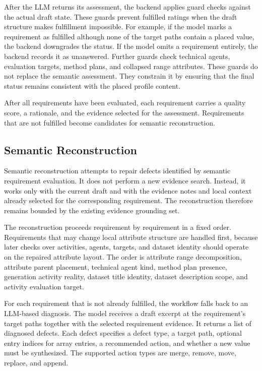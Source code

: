 After the \ac{LLM} returns its assessment, the backend applies guard checks against the actual draft state.
These guards prevent fulfilled ratings when the draft structure makes fulfillment impossible.
For example, if the model marks a requirement as fulfilled although none of the target paths contain a placed value, the backend downgrades the status.
If the model omits a requirement entirely, the backend records it as unanswered.
Further guards check technical agents, evaluation targets, method plans, and collapsed range attributes.
These guards do not replace the semantic assessment.
They constrain it by ensuring that the final status remains consistent with the placed profile content.

After all requirements have been evaluated, each requirement carries a quality score, a rationale, and the evidence selected for the assessment.
Requirements that are not fulfilled become candidates for semantic reconstruction.

\subsection{Semantic Reconstruction}
\label{sec:semantic_reconstruction}

Semantic reconstruction attempts to repair defects identified by semantic requirement evaluation.
It does not perform a new evidence search.
Instead, it works only with the current draft and with the evidence notes and local context already selected for the corresponding requirement.
The reconstruction therefore remains bounded by the existing evidence grounding set.

The reconstruction proceeds requirement by requirement in a fixed order.
Requirements that may change local attribute structure are handled first, because later checks over activities, agents, targets, and dataset identity should operate on the repaired attribute layout.
The order is attribute range decomposition, attribute parent placement, technical agent kind, method plan presence, generation activity reality, dataset title identity, dataset description scope, and activity evaluation target.

For each requirement that is not already fulfilled, the workflow falls back to an \ac{LLM}-based diagnosis.
The model receives a draft excerpt at the requirement's target paths together with the selected requirement evidence.
It returns a list of diagnosed defects.
Each defect specifies a defect type, a target path, optional entry indices for array entries, a recommended action, and whether a new value must be synthesized.
The supported action types are merge, remove, move, replace, and append.

